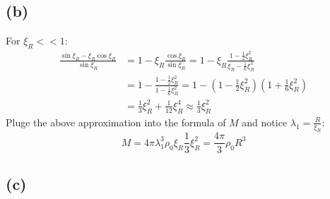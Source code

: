 \documentclass[a4paper,12pt]{article}
\begin{document}
\subsection*{(b)}
For $\xi_R << 1$:
\begin{align*}
    \frac{\sin \xi_R - \xi_R\cos \xi_R}{\sin \xi_R}
    &= 1 - \xi_R \frac{\cos \xi_R}{\sin \xi_R}
    = 1 - \xi_R \frac{1-\frac{1}{2} \xi_R^2}{\xi_R - \frac{1}{6} \xi_R^3} \\
    &= 1 - \frac{1-\frac{1}{2} \xi_R^2}{1-\frac{1}{6} \xi_R^2}
    = 1 - (1-\frac{1}{2} \xi_R^2)(1+\frac{1}{6} \xi_R^2) \\
    &= \frac{1}{3} \xi_R^2 + \frac{1}{12} \xi_R^4 \approx \frac{1}{3} \xi_R^2
\end{align*}
Pluge the above approximation into the formula of $M$ and notice $\lambda_1 = \frac{R}{\xi_R}$:
\begin{equation*}
    M = 4\pi \lambda_1^3 \rho_0 \xi_R \frac{1}{3} \xi_R^2 = \frac{4\pi}{3} \rho_0 R^3
\end{equation*}

\subsection*{(c)}
\end{document}
